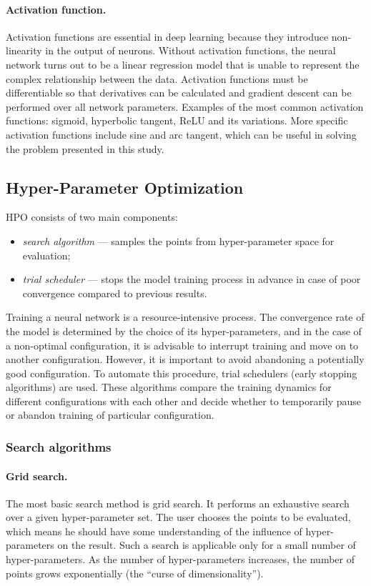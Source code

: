 \documentclass[reprint,
superscriptaddress,
amsmath,amssymb,aps,showkeys,showpacs,
twoside,final,secnumarabic,%
nofootinbib]{revtex4-2}
\begin{document}
\paragraph*{Activation function.}
Activation functions are essential in deep learning because they introduce non-linearity in the output of neurons. Without activation functions, the neural network turns out to be a linear regression model that is unable to represent the complex relationship between the data. Activation functions must be differentiable so that derivatives can be calculated and gradient descent can be performed over all network parameters. Examples of the most common activation functions: sigmoid, hyperbolic tangent, ReLU and its variations. More specific activation functions include sine and arc tangent, which can be useful in solving the problem presented in this study.

\subsection{Hyper-Parameter Optimization}
HPO consists of two main components:
\begin{itemize}
\item \textit{search algorithm} — samples the points from hyper-parameter space for evaluation;
\item \textit{trial scheduler} — stops the model training process in advance in case of poor convergence compared to previous results.
\end{itemize}

Training a neural network is a resource-intensive process. The convergence rate of the model is determined by the choice of its hyper-parameters, and in the case of a non-optimal configuration, it is advisable to interrupt training and move on to another configuration. However, it is important to avoid abandoning a potentially good configuration. To automate this procedure, trial schedulers (early stopping algorithms) are used. These algorithms compare the training dynamics for different configurations with each other and decide whether to temporarily pause or abandon training of particular configuration.
 
\subsubsection{Search algorithms}

\paragraph*{Grid search.}
The most basic search method is grid search. It performs an exhaustive search over a given hyper-parameter set. The user chooses the points to be evaluated, which means he should have some understanding of the influence of hyper-parameters on the result. Such a search is applicable only for a small number of hyper-parameters. As the number of hyper-parameters increases, the number of points grows exponentially (the “curse of dimensionality”).
\end{document}
